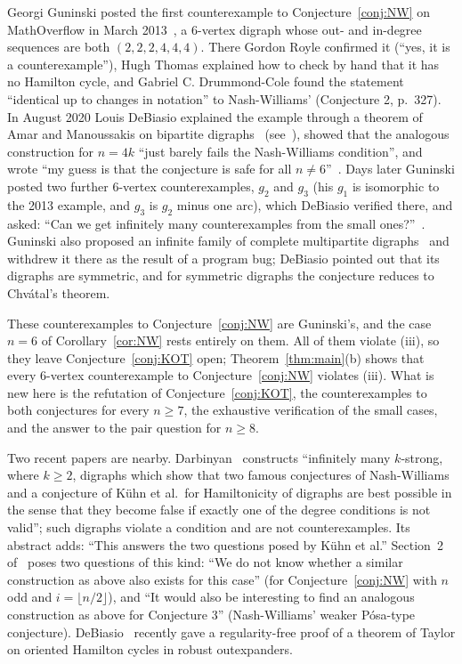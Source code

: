 \documentclass[11pt]{article}
\begin{document}
Georgi Guninski posted the first counterexample to Conjecture~\ref{conj:NW} on MathOverflow in March 2013~\cite{Gu13}, a 6-vertex digraph whose out- and in-degree sequences are both $(2,2,2,4,4,4)$. There Gordon Royle confirmed it (``yes, it is a counterexample''), Hugh Thomas explained how to check by hand that it has no Hamilton cycle, and Gabriel C. Drummond-Cole found the statement ``identical up to changes in notation'' to Nash-Williams' (Conjecture 2, p.~327). In August 2020 Louis DeBiasio explained the example through a theorem of Amar and Manoussakis on bipartite digraphs~\cite{AM} (see~\cite[Theorem 1.7]{AAY}), showed that the analogous construction for $n=4k$ ``just barely fails the Nash-Williams condition'', and wrote ``my guess is that the conjecture is safe for all $n\neq6$''~\cite{Gu13}. Days later Guninski posted two further 6-vertex counterexamples, $g_2$ and $g_3$ (his $g_1$ is isomorphic to the 2013 example, and $g_3$ is $g_2$ minus one arc), which DeBiasio verified there, and asked: ``Can we get infinitely many counterexamples from the small ones?''~\cite{Gu20}. Guninski also proposed an infinite family of complete multipartite digraphs~\cite{Gu20b} and withdrew it there as the result of a program bug; DeBiasio pointed out that its digraphs are symmetric, and for symmetric digraphs the conjecture reduces to Chvátal's theorem.

These counterexamples to Conjecture~\ref{conj:NW} are Guninski's, and the case $n=6$ of Corollary~\ref{cor:NW} rests entirely on them. All of them violate (iii), so they leave Conjecture~\ref{conj:KOT} open; Theorem~\ref{thm:main}(b) shows that every 6-vertex counterexample to Conjecture~\ref{conj:NW} violates (iii). What is new here is the refutation of Conjecture~\ref{conj:KOT}, the counterexamples to both conjectures for every $n\ge7$, the exhaustive verification of the small cases, and the answer to the pair question for $n\ge8$.

Two recent papers are nearby. Darbinyan~\cite{Da} constructs ``infinitely many $k$-strong, where $k\ge2$, digraphs which show that two famous conjectures of Nash-Williams and a conjecture of Kühn et al.\ for Hamiltonicity of digraphs are best possible in the sense that they become false if exactly one of the degree conditions is not valid''; such digraphs violate a condition and are not counterexamples. Its abstract adds: ``This answers the two questions posed by Kühn et al.'' Section~2 of~\cite{KOT} poses two questions of this kind: ``We do not know whether a similar construction as above also exists for this case'' (for Conjecture~\ref{conj:NW} with $n$ odd and $i=\lfloor n/2\rfloor$), and ``It would also be interesting to find an analogous construction as above for Conjecture 3'' (Nash-Williams' weaker Pósa-type conjecture). DeBiasio~\cite{De} recently gave a regularity-free proof of a theorem of Taylor on oriented Hamilton cycles in robust outexpanders.
\end{document}
